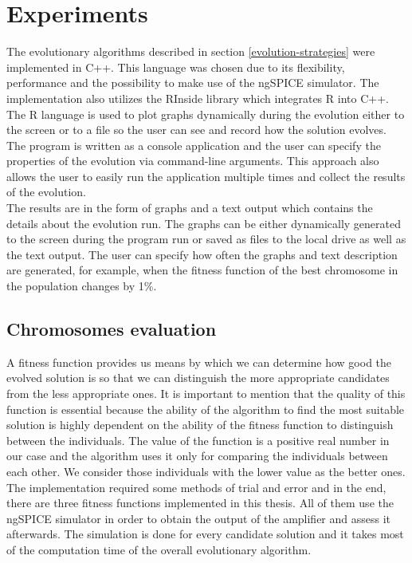 \chapter{Experiments}
The evolutionary algorithms described in section \ref{evolution-strategies} were implemented in C++. This language was chosen due to its flexibility, performance and the possibility to make use of the ngSPICE simulator. The implementation also utilizes the RInside library which integrates R into C++. The R language is used to plot graphs dynamically during the evolution either to the screen or to a file so the user can see and record how the solution evolves.\\
The program is written as a console application and the user can specify the properties of the evolution via command-line arguments. This approach also allows the user to easily run the application multiple times and collect the results of the evolution.\\
The results are in the form of graphs and a text output which contains the details about the evolution run. The graphs can be either dynamically generated to the screen during the program run or saved as files to the local drive as well as the text output. The user can specify how often the graphs and text description are generated, for example, when the fitness function of the best chromosome in the population changes by 1\%.

\section{Chromosomes evaluation} \label{chromosomes-evaluation}
A fitness function provides us means by which we can determine how good the evolved solution is so that we can distinguish the more appropriate candidates from the less appropriate ones. It is important to mention that the quality of this function is essential because the ability of the algorithm to find the most suitable solution is highly dependent on the ability of the fitness function to distinguish between the individuals. The value of the function is a positive real number in our case and the algorithm uses it only for comparing the individuals between each other. We consider those individuals with the lower value as the better ones.\\
The implementation required some methods of trial and error and in the end, there are three fitness functions implemented in this thesis. All of them use the ngSPICE simulator in order to obtain the output of the amplifier and assess it afterwards. The simulation is done for every candidate solution and it takes most of the computation time of the overall evolutionary algorithm.

